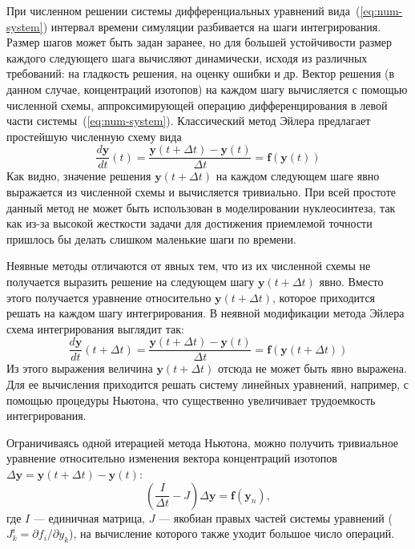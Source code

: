 При численном решении системы дифференциальных уравнений вида~(\ref{eq:num-system}) интервал времени симуляции разбивается на шаги интегрирования. Размер шагов может быть задан заранее, но для большей устойчивости размер каждого следующего шага вычисляют динамически, исходя из различных требований: на гладкость решения, на оценку ошибки и др. Вектор решения (в данном случае, концентраций изотопов) на каждом шагу вычисляется с помощью численной схемы, аппроксимирующей операцию дифференцирования в левой части системы~(\ref{eq:num-system}). Классический метод Эйлера предлагает простейшую численную схему вида
\begin{equation}
\displaystyle
\frac{d \bm{y}}{d t}(t) = 
\frac{\bm{y}(t + \Delta t) - \bm{y}(t)}{\Delta t} = \bm{f}(\bm{y}(t))
\end{equation}
Как видно, значение решения $\bm{y}(t + \Delta t)$ на каждом следующем шаге явно выражается из численной схемы и вычисляется тривиально. При всей простоте данный метод не может быть использован в моделировании нуклеосинтеза, так как из-за высокой жесткости задачи для достижения приемлемой точности пришлось бы делать слишком маленькие шаги по времени.

Неявные методы отличаются от явных тем, что из их численной схемы не получается выразить решение на следующем шагу $\bm{y}(t + \Delta t)$ явно. Вместо этого получается уравнение относительно $\bm{y}(t + \Delta t)$, которое приходится решать на каждом шагу интегрирования. В неявной модификации метода Эйлера схема интегрирования выглядит так: 
\begin{equation}
\displaystyle
\frac{d \bm{y}}{d t}(t + \Delta t) = 
\frac{\bm{y}(t + \Delta t) - \bm{y}(t)}{\Delta t} = 
\bm{f}(\bm{y}(t + \Delta t))
\end{equation}
Из этого выражения величина $\bm{y}(t + \Delta t)$ отсюда не может быть явно выражена. Для ее вычисления приходится решать систему линейных уравнений, например, с помощью процедуры Ньютона, что существенно увеличивает трудоемкость интегрирования. 

Ограничиваясь одной итерацией метода Ньютона, можно получить тривиальное уравнение относительно изменения вектора концентраций изотопов $\Delta \bm{y} = \bm{y}(t + \Delta t) - \bm{y}(t)$:
\begin{equation}
\displaystyle
  \left( \frac{I}{\Delta t} - J \right) \Delta \bm{y} = \bm{f}(\bm{y}_n),
\end{equation}
где $I$ --- единичная матрица, $J$ --- якобиан правых частей системы уравнений ($J_k^i = \partial f_i/\partial y_k$), на вычисление которого также уходит большое число операций.

